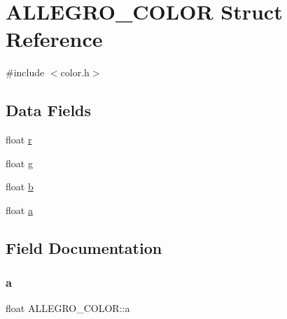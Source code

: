 \hypertarget{struct_a_l_l_e_g_r_o___c_o_l_o_r}{}\section{A\+L\+L\+E\+G\+R\+O\+\_\+\+C\+O\+L\+OR Struct Reference}
\label{struct_a_l_l_e_g_r_o___c_o_l_o_r}


{\ttfamily \#include $<$color.\+h$>$}

\subsection*{Data Fields}
\begin{DoxyCompactItemize}
\item 
float \hyperlink{struct_a_l_l_e_g_r_o___c_o_l_o_r_a326895cc42252a347059ebb8c9248fc8}{r}
\item 
float \hyperlink{struct_a_l_l_e_g_r_o___c_o_l_o_r_af91c6e20e44474c2cfc07d0861b6d0c0}{g}
\item 
float \hyperlink{struct_a_l_l_e_g_r_o___c_o_l_o_r_acb8957e52d90820b1886dbb182a522fb}{b}
\item 
float \hyperlink{struct_a_l_l_e_g_r_o___c_o_l_o_r_a04ef69b46740a973959da49bf4c408c9}{a}
\end{DoxyCompactItemize}


\subsection{Field Documentation}
\mbox{\label{struct_a_l_l_e_g_r_o___c_o_l_o_r_a04ef69b46740a973959da49bf4c408c9}} 
\subsubsection{\texorpdfstring{a}{a}}
{\footnotesize\ttfamily float A\+L\+L\+E\+G\+R\+O\+\_\+\+C\+O\+L\+O\+R\+::a}

\mbox{\label{struct_a_l_l_e_g_r_o___c_o_l_o_r_acb8957e52d90820b1886dbb182a522fb}} 
